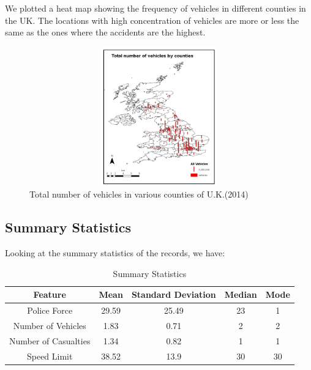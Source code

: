 \documentclass[a4paper, 10pt]{article}
\begin{document}
 We plotted a heat map showing the frequency of vehicles in different counties in the UK. The locations with high concentration of vehicles are more or less the same as the ones where the accidents are the highest. \\

 \begin{figure}[H]
   \begin{center}
     \includegraphics[width=70cm,height=6cm, scale=0.4,keepaspectratio]{vehicles-by-county.png}
     \caption{Total number of vehicles in various counties of U.K.(2014)}
    \end{center}
  \end{figure}

\subsection{Summary Statistics}
  Looking at the summary statistics of the records, we have: \\

\begin {table}[H]
 \caption {Summary Statistics}
    \begin{center}
 \begin{tabular}{c c c c c} 
  \hline
 Feature & Mean & Standard Deviation & Median & Mode \\ 
 \hline
 Police Force & 29.59 & 25.49 & 23 & 1  \\ 
 
 Number of Vehicles & 1.83 & 0.71 & 2 & 2 \\
 
 Number of Casualties & 1.34 & 0.82 & 1 & 1 \\

 Speed Limit & 38.52 & 13.9 & 30 & 30 \\
 \hline
\end{tabular}
  \end{center}
\end {table}
\end{document}
